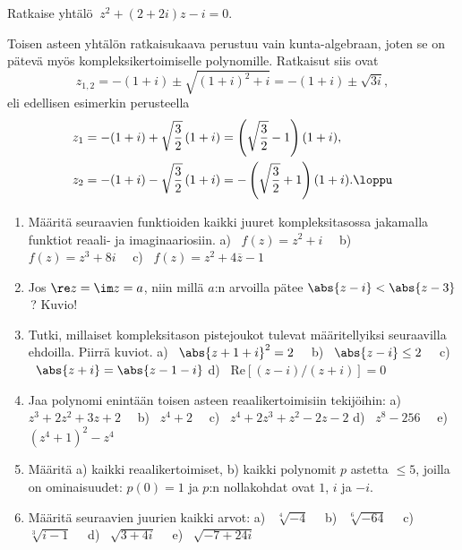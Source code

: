 \begin{Exa} Ratkaise yhtälö $\ z^2+(2+2i)z-i=0$. \end{Exa}
\ratk Toisen asteen yhtälön ratkaisukaava perustuu vain kunta-algebraan, joten se on pätevä 
myös kompleksikertoimiselle polynomille. Ratkaisut siis ovat
\[
z_{1,2} = -(1+i) \pm\sqrt{(1+i)^2+i} = -(1+i)\pm\sqrt{3i},
\]
eli edellisen esimerkin perusteella
\begin{align*}
z_1 &= -(1+i) + \sqrt{\frac{3}{2}}\,(1+i) = \left(\sqrt{\frac{3}{2}}-1\right)(1+i), \\
z_2 &= -(1+i) - \sqrt{\frac{3}{2}}\,(1+i) = -\left(\sqrt{\frac{3}{2}}+1\right)(1+i). \loppu
\end{align*}

\Harj
\begin{enumerate}

\item
Määritä seuraavien funktioiden kaikki juuret kompleksitasossa jakamalla funktiot reaali- 
ja imaginaariosiin. \newline
a) \ $f(z)=z^2+i \quad$ 
b) \ $f(z)=z^3+8i \quad$ 
c) \ $f(z)=z^2+4\overline{z}-1$

\item
Jos $\re z=\im z=a$, niin millä $a$:n arvoilla pätee $\abs{z-i}<\abs{z-3}$\,? Kuvio!

\item
Tutki, millaiset kompleksitason pistejoukot tulevat määritellyiksi seuraavilla ehdoilla. 
Piirrä kuviot. \newline
a) \ $\abs{z+1+i}^2=2 \quad$ 
b) \ $\abs{z-i} \le 2 \quad$ 
c) \ $\abs{z+i}=\abs{z-1-i}$ \newline
d) \ $\text{Re}[(z-i)/(z+i)]=0$

\item
Jaa polynomi enintään toisen asteen reaalikertoimisiin tekijöihin: \newline
a) \ $z^3+2z^2+3z+2 \quad$ 
b) \ $z^4+2 \quad$ 
c) \ $z^4+2z^3+z^2-2z-2$ \newline
d) \ $z^8-256 \quad$ 
e) \ $(z^4+1)^2-z^4$

\item
Määritä a) kaikki reaalikertoimiset, b) kaikki polynomit $p$ astetta $\le 5$, joilla on
ominaisuudet: $p(0)=1$ ja $p$:n nollakohdat ovat $1$, $i$ ja $-i$.

\item
Määritä seuraavien juurien kaikki arvot: \newline
a) \ $\sqrt[4]{-4} \quad$ 
b) \ $\sqrt[6]{-64} \quad$
c) \ $\sqrt[3]{i-1} \quad$
d) \ $\sqrt{3+4i} \quad$ 
e) \ $\sqrt{-7+24i}$


\end{enumerate}

